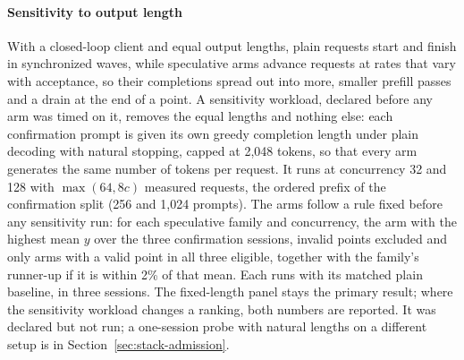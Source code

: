 \paragraph{Sensitivity to output length} With a closed-loop client and equal output lengths, plain requests start and finish in synchronized waves, while speculative arms advance requests at rates that vary with acceptance, so their completions spread out into more, smaller prefill passes and a drain at the end of a point. A sensitivity workload, declared before any arm was timed on it, removes the equal lengths and nothing else: each confirmation prompt is given its own greedy completion length under plain decoding with natural stopping, capped at 2,048 tokens, so that every arm generates the same number of tokens per request. It runs at concurrency 32 and 128 with $\max(64,8c)$ measured requests, the ordered prefix of the confirmation split (256 and 1,024 prompts). The arms follow a rule fixed before any sensitivity run: for each speculative family and concurrency, the arm with the highest mean $y$ over the three confirmation sessions, invalid points excluded and only arms with a valid point in all three eligible, together with the family's runner-up if it is within 2\% of that mean. Each runs with its matched plain baseline, in three sessions. The fixed-length panel stays the primary result; where the sensitivity workload changes a ranking, both numbers are reported. It was declared but not run; a one-session probe with natural lengths on a different setup is in Section~\ref{sec:stack-admission}.
